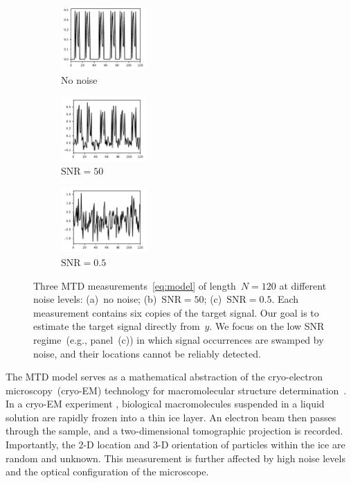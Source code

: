 \documentclass{article}
\begin{document}
\begin{figure}[!tb]
	\begin{subfigure}[ht]{0.33\textwidth}
		\centering
		\includegraphics[width=\columnwidth, height=70pt]{figures/y_clean.pdf}
		\caption{No noise}
	\end{subfigure}
	\hfill
	\begin{subfigure}[ht]{0.33\textwidth}
		\centering
		\includegraphics[width=\columnwidth, height=70pt]{figures/y_SNR50.pdf}
		\caption{$\text{SNR} = 50$}
	\end{subfigure}
	\hfill
	\begin{subfigure}[ht]{0.33\textwidth}
		\centering
		\includegraphics[width=\columnwidth, height=70pt]{figures/y_SNR01.pdf}
		\caption{$\text{SNR} = 0.5$}
	\end{subfigure}
	\caption{Three MTD measurements~\eqref{eq:model} {of length~\mbox{$N = 120$}} at different noise levels: (a)~no noise; (b)~\mbox{$\text{SNR} = 50$}; (c)~\mbox{$\text{SNR} = 0.5$}. Each measurement contains six copies of the target signal. Our goal is to estimate the target signal directly from~$y$. We focus on the low SNR regime~(e.g., panel~(c)) in which  signal occurrences are swamped by  noise, and their locations  cannot be reliably detected.}
\label{fig:measurements}
\end{figure}

The MTD model serves as a mathematical abstraction of the cryo-electron microscopy~(\mbox{cryo-EM}) technology for macromolecular structure determination~\cite{henderson1995potential,nogales2016development,bai2015cryo}. In a \mbox{cryo-EM} experiment \cite{frank2006three}, biological macromolecules suspended in a liquid solution are rapidly frozen into a thin ice layer. An electron beam then passes through the sample, and a two-dimensional tomographic projection is recorded. Importantly, the \mbox{2-D} location and \mbox{3-D} orientation of particles within the ice are random and unknown. This measurement is further affected by high noise levels and the optical configuration of the microscope.
\end{document}
